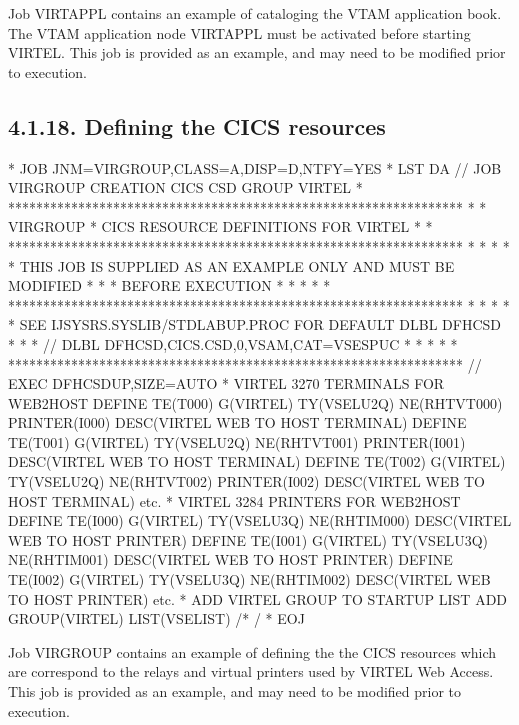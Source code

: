 \documentclass[letterpaper,10pt,english]{sphinxmanual}
\begin{document}

Job VIRTAPPL contains an example of cataloging the VTAM application book. The VTAM application node VIRTAPPL must be activated before starting VIRTEL. This job is provided as an example, and may need to be modified prior to execution.


\subsection{4.1.18. Defining the CICS resources}
\label{\detokenize{Installation_Guide:defining-the-cics-resources}}
\begin{sphinxVerbatim}[commandchars=\\\{\}]
* \PYGZdl{}\PYGZdl{} JOB JNM=VIRGROUP,CLASS=A,DISP=D,NTFY=YES
* \PYGZdl{}\PYGZdl{} LST DA
// JOB VIRGROUP CREATION CICS CSD GROUP VIRTEL
* *****************************************************************
* * VIRGROUP * CICS RESOURCE DEFINITIONS FOR VIRTEL *
* *****************************************************************
* * *
* * THIS JOB IS SUPPLIED AS AN EXAMPLE ONLY AND MUST BE MODIFIED *
* * BEFORE EXECUTION *
* * *
* *****************************************************************
* * *
* * SEE IJSYSRS.SYSLIB/STDLABUP.PROC FOR DEFAULT DLBL DFHCSD *
* * // DLBL DFHCSD,\PYGZsq{}CICS.CSD\PYGZsq{},0,VSAM,CAT=VSESPUC *
* * *
* *****************************************************************
// EXEC DFHCSDUP,SIZE=AUTO
* VIRTEL 3270 TERMINALS FOR WEB2HOST
  DEFINE TE(T000) G(VIRTEL) TY(VSELU2Q) NE(RHTVT000) PRINTER(I000)
      DESC(VIRTEL WEB TO HOST TERMINAL)
  DEFINE TE(T001) G(VIRTEL) TY(VSELU2Q) NE(RHTVT001) PRINTER(I001)
      DESC(VIRTEL WEB TO HOST TERMINAL)
  DEFINE TE(T002) G(VIRTEL) TY(VSELU2Q) NE(RHTVT002) PRINTER(I002)
      DESC(VIRTEL WEB TO HOST TERMINAL)
      etc.
* VIRTEL 3284 PRINTERS FOR WEB2HOST
  DEFINE TE(I000) G(VIRTEL) TY(VSELU3Q) NE(RHTIM000)
      DESC(VIRTEL WEB TO HOST PRINTER)
  DEFINE TE(I001) G(VIRTEL) TY(VSELU3Q) NE(RHTIM001)
      DESC(VIRTEL WEB TO HOST PRINTER)
  DEFINE TE(I002) G(VIRTEL) TY(VSELU3Q) NE(RHTIM002)
      DESC(VIRTEL WEB TO HOST PRINTER)
    etc.
* ADD VIRTEL GROUP TO STARTUP LIST
  ADD GROUP(VIRTEL) LIST(VSELIST)
 /*
/\PYGZam{}
* \PYGZdl{}\PYGZdl{} EOJ
\end{sphinxVerbatim}


Job VIRGROUP contains an example of defining the the CICS resources which are correspond to the relays and virtual printers used by VIRTEL Web Access. This job is provided as an example, and may need to be modified prior to execution.
\end{document}
